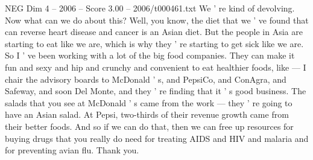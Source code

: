 \begin{textsample}{NEG Dim 4 – 2006 – Score 3.00 – 2006/t000461.txt}
We ' re kind of devolving.
Now what can we do about this?
Well, you know, the diet that we ' ve found that can reverse heart disease and cancer is an Asian diet.
But the people in Asia are starting to eat like we are, which is why they ' re starting to get sick like we are.
So I ' ve been working with a lot of the big food companies.
They can make it fun and sexy and hip and crunchy and convenient to eat healthier foods, like — I chair the advisory boards to McDonald ' s, and PepsiCo, and ConAgra, and Safeway, and soon Del Monte, and they ' re finding that it ' s good business.
The salads that you see at McDonald ' s came from the work — they ' re going to have an Asian salad.
At Pepsi, two-thirds of their revenue growth came from their better foods.
And so if we can do that, then we can free up resources for buying drugs that you really do need for treating AIDS and HIV and malaria and for preventing avian flu.
Thank you.

\end{textsample}
